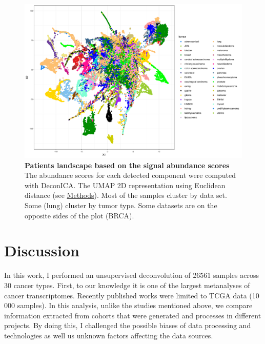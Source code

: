\documentclass[12pt,]{book}
\theoremstyle{definition}
\theoremstyle{definition}
\theoremstyle{definition}
\theoremstyle{remark}
\begin{document}
\begin{figure}

{\centering \includegraphics[width=1\linewidth]{figures-ext/row_centres_tumor} 

}

\caption[Patients landscape based on the signal abudance scores]{\textbf{Patients landscape based on the signal
abundance scores} The abundance scores for each detected component were
computed with DeconICA. The UMAP 2D representation using Euclidean
distance (see \protect\hyperlink{methods-1}{Methods}). Most of the
samples cluster by data set. Some (lung) cluster by tumor type. Some
datasets are on the opposite sides of the plot (BRCA).}\label{fig:samples}
\end{figure}








\hypertarget{discussion}{%
\section{Discussion}\label{discussion}}

In this work, I performed an unsupervised deconvolution of 26561 samples
across 30 cancer types. First, to our knowledge it is one of the largest
metanalyses of cancer transcriptomes. Recently published works
\citep{Thorsson2018, Tamborero2018} were limited to TCGA data (10 000
samples). In this analysis, unlike the studies mentioned above, we
compare information extracted from cohorts that were generated and
processes in different projects. By doing this, I challenged the
possible biases of data processing and technologies as well us unknown
factors affecting the data sources.
\end{document}
